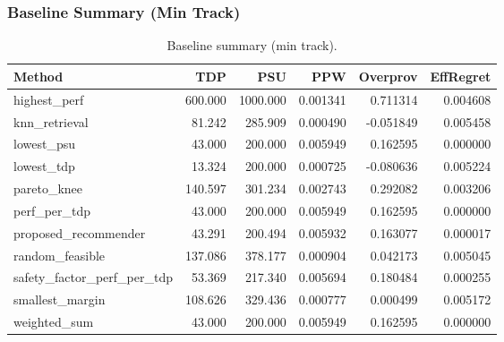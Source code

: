 \subsubsection{Baseline Summary (Min Track)}
\begin{table}[t]
\centering
\small
\caption{Baseline summary (min track).}
\label{tab:baseline_min}
\begin{tabular}{lrrrrr}
\hline
Method & TDP & PSU & PPW & Overprov & EffRegret \\
\hline
highest\_perf & 600.000 & 1000.000 & 0.001341 & 0.711314 & 0.004608 \\
knn\_retrieval & 81.242 & 285.909 & 0.000490 & -0.051849 & 0.005458 \\
lowest\_psu & 43.000 & 200.000 & 0.005949 & 0.162595 & 0.000000 \\
lowest\_tdp & 13.324 & 200.000 & 0.000725 & -0.080636 & 0.005224 \\
pareto\_knee & 140.597 & 301.234 & 0.002743 & 0.292082 & 0.003206 \\
perf\_per\_tdp & 43.000 & 200.000 & 0.005949 & 0.162595 & 0.000000 \\
proposed\_recommender & 43.291 & 200.494 & 0.005932 & 0.163077 & 0.000017 \\
random\_feasible & 137.086 & 378.177 & 0.000904 & 0.042173 & 0.005045 \\
safety\_factor\_perf\_per\_tdp & 53.369 & 217.340 & 0.005694 & 0.180484 & 0.000255 \\
smallest\_margin & 108.626 & 329.436 & 0.000777 & 0.000499 & 0.005172 \\
weighted\_sum & 43.000 & 200.000 & 0.005949 & 0.162595 & 0.000000 \\
\hline
\end{tabular}
\end{table}

